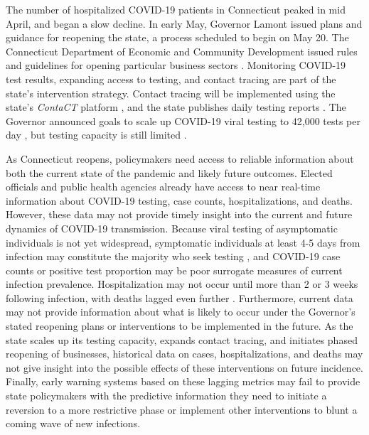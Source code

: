 \documentclass[11pt]{article}
\begin{document}

The number of hospitalized COVID-19 patients in Connecticut peaked in mid April, and began a slow decline.  In early May, Governor Lamont issued plans and guidance for reopening the state, a process scheduled to begin on May 20. The Connecticut Department of Economic and Community Development issued rules and guidelines for opening particular business sectors \citep{decd2020coronavirus}. 
Monitoring COVID-19 test results, expanding access to testing, and contact tracing are part of the state's intervention strategy.  Contact tracing will be implemented using the state's \emph{ContaCT} platform \citep{ct2020contact}, and the state publishes daily testing reports \citep[e.g.][]{ct2020testing}. 
The Governor announced goals to scale up COVID-19 viral testing to 42,000 tests per day \citep{lamont2020suspension,phaneuf2020lamont}, but testing capacity is still limited \cite{thomas2020surge}. 


As Connecticut reopens, policymakers need access to reliable information about both the current state of the pandemic and likely future outcomes.  Elected officials and public health agencies already have access to near real-time information about COVID-19 testing, case counts, hospitalizations, and deaths.  However, these data may not provide timely insight into the current and future dynamics of COVID-19 transmission.  Because viral testing of asymptomatic individuals is not yet widespread, symptomatic individuals at least 4-5 days from infection may constitute the majority who seek testing \citep{lauer2020incubation, bi2020epidemiology, li2020early, linton2020incubation, he2020estimation, salje2020estimating, wei2020presymptomatic}, and COVID-19 case counts or positive test proportion may be poor surrogate measures of current infection prevalence.  Hospitalization may not occur until more than 2 or 3 weeks following infection, with deaths lagged even further \citep{verity2020estimates, bi2020epidemiology, garg2020hospitalization, rees2020covid, lewnard2020incidence, paranjpe2020clinical}.  Furthermore, current data may not provide information about what is likely to occur under the Governor's stated reopening plans or interventions to be implemented in the future. As the state scales up its testing capacity, expands contact tracing, and initiates phased reopening of businesses, historical data on cases, hospitalizations, and deaths may not give insight into the possible effects of these interventions on future incidence.  Finally, early warning systems based on these lagging metrics may fail to provide state policymakers with the predictive information they need to initiate a reversion to a more restrictive phase or implement other interventions to blunt a coming wave of new infections. 
\end{document}
